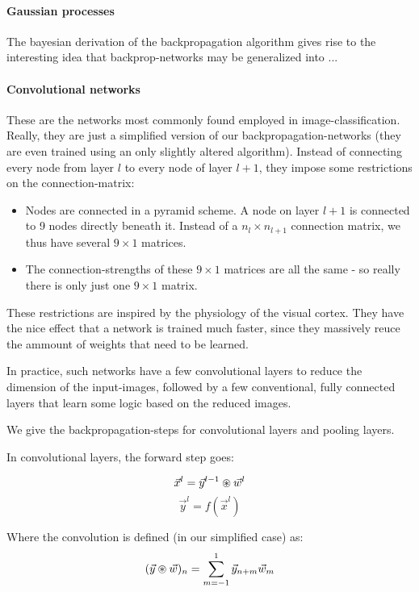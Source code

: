 \paragraph{Gaussian processes}

The bayesian derivation of the backpropagation algorithm gives rise to the interesting idea that backprop-networks may be generalized into ...

\paragraph{Convolutional networks}

These are the networks most commonly found employed in image-classification. Really, they are just a simplified version of our backpropagation-networks (they are even trained using an only slightly altered algorithm). Instead of connecting every node from layer $l$ to every node of layer $l+1$, they impose some restrictions on the connection-matrix:
\begin{itemize}
	\item Nodes are connected in a pyramid scheme. A node on layer $l+1$ is connected to 9 nodes directly beneath it. Instead of a $n_l \times n_{l+1}$ connection matrix, we thus have several $9 \times 1$ matrices.
	\item The connection-strengths of these  $9 \times 1$ matrices are all the same - so really there is only just one  $9 \times 1$ matrix. 
\end{itemize}
These restrictions are inspired by the physiology of the visual cortex. They have the nice effect that a network is trained much faster, since they massively reuce the ammount of weights that need to be learned. 

In practice, such networks have a few convolutional layers to reduce the dimension of the input-images, followed by a few conventional, fully connected layers that learn some logic based on the reduced images. 

We give the backpropagation-steps for convolutional layers and pooling layers. 

In convolutional layers, the forward step goes: 

$$ \vec{x}^l = \vec{y}^{l-1} \circledast \vec{w}^l $$
$$ \vec{y}^l = f(\vec{x}^l) $$

Where the convolution is defined (in our simplified case) as:
$$ (\vec{y} \circledast \vec{w})_n = \sum_{m=-1}^1 \vec{y}_{n+m} \vec{w}_m $$

